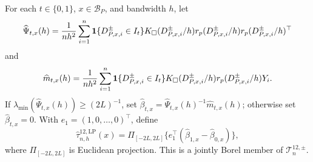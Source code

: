 For each \(t\in\{0,1\}\), \(x\in\mathcal B_P\), and bandwidth \(h\), let
\[
 \widehat\Psi_{t,x}(h)={1\over nh^2}\sum_{i=1}^n\mathbf1\{D^{\pm}_{P,x,i}\in I_t\}K_\square(D^{\pm}_{P,x,i}/h)r_p(D^{\pm}_{P,x,i}/h)r_p(D^{\pm}_{P,x,i}/h)^\top
\]
and
\[
 \widehat m_{t,x}(h)={1\over nh^2}\sum_{i=1}^n\mathbf1\{D^{\pm}_{P,x,i}\in I_t\}K_\square(D^{\pm}_{P,x,i}/h)r_p(D^{\pm}_{P,x,i}/h)Y_i.
\]
If \(\lambda_{\min}(\widehat\Psi_{t,x}(h))\geq(2L)^{-1}\), set \(\widehat\beta_{t,x}=\widehat\Psi_{t,x}(h)^{-1}\widehat m_{t,x}(h)\); otherwise set \(\widehat\beta_{t,x}=0\).  With \(e_1=(1,0,\ldots,0)^\top\), define
\[
 \widehat\tau^{12,\mathrm{LP}}_{n,h}(x)=\Pi_{[-2L,2L]}\{e_1^\top(\widehat\beta_{1,x}-\widehat\beta_{0,x})\},
\]
where \(\Pi_{[-2L,2L]}\) is Euclidean projection.  This is a jointly Borel member of \(\mathcal T^{12,\pm}_n\).